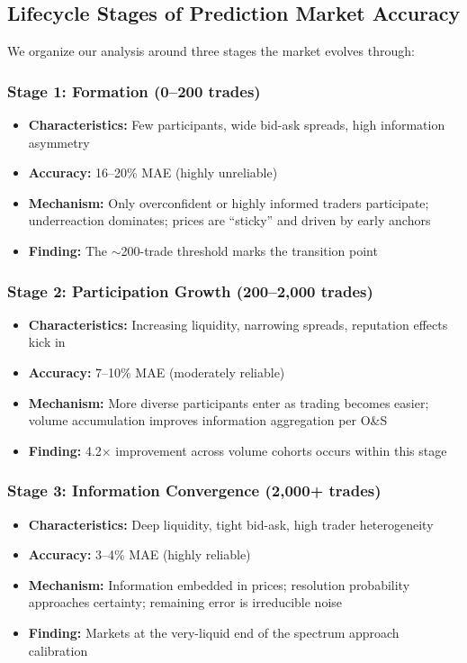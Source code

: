 \documentclass[12pt,letterpaper]{article}
\begin{document}
\subsection{Lifecycle Stages of Prediction Market Accuracy}

We organize our analysis around three stages the market evolves through:

\subsubsection{Stage 1: Formation (0--200 trades)}
\begin{itemize}[leftmargin=*]
    \item \textbf{Characteristics:} Few participants, wide bid-ask spreads, high information asymmetry
    \item \textbf{Accuracy:} 16--20\% MAE (highly unreliable)
    \item \textbf{Mechanism:} Only overconfident or highly informed traders participate; underreaction dominates; prices are ``sticky'' and driven by early anchors
    \item \textbf{Finding:} The $\sim$200-trade threshold marks the transition point
\end{itemize}

\subsubsection{Stage 2: Participation Growth (200--2,000 trades)}
\begin{itemize}[leftmargin=*]
    \item \textbf{Characteristics:} Increasing liquidity, narrowing spreads, reputation effects kick in
    \item \textbf{Accuracy:} 7--10\% MAE (moderately reliable)
    \item \textbf{Mechanism:} More diverse participants enter as trading becomes easier; volume accumulation improves information aggregation per O\&S
    \item \textbf{Finding:} 4.2$\times$ improvement across volume cohorts occurs within this stage
\end{itemize}

\subsubsection{Stage 3: Information Convergence (2,000+ trades)}
\begin{itemize}[leftmargin=*]
    \item \textbf{Characteristics:} Deep liquidity, tight bid-ask, high trader heterogeneity
    \item \textbf{Accuracy:} 3--4\% MAE (highly reliable)
    \item \textbf{Mechanism:} Information embedded in prices; resolution probability approaches certainty; remaining error is irreducible noise
    \item \textbf{Finding:} Markets at the very-liquid end of the spectrum approach calibration
\end{itemize}
\end{document}
